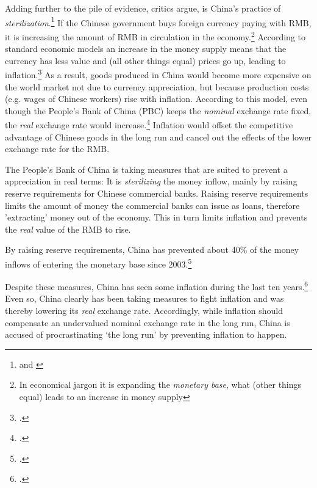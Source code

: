 Adding further to the pile of evidence, critics argue, is China's 
practice of \emph{sterilization}.\footnote{\cite{Humpage2010} and \cite[p. ?]{Wang2011}} If the Chinese government buys foreign 
currency paying with RMB, it is increasing the amount of RMB in 
circulation in the economy.\footnote{In economical jargon it is 
expanding the \emph{monetary base}, what (other things equal) leads to 
an increase in money supply} According to standard economic models an 
increase in the money supply means that the currency has less value and 
(all other things equal) prices go up, leading to 
inflation.\footnote{\cite[pp. 432]{Krugman2008}.}
As a result, goods produced in China would become more expensive on the 
world market not due to currency appreciation, but because production 
costs (e.g. wages of Chinese workers) rise with inflation. According to 
this model, even though the People's Bank of China (PBC) keeps the 
\emph{nominal} exchange rate fixed, the \emph{real} exchange rate would 
increase.\footnote{\cite[p. 509]{Krugman2008}.} Inflation would offset the 
competitive advantage of Chinese goods in the long run and cancel out 
the effects of the lower exchange rate for the RMB.

The People's Bank of China is taking measures that are suited to prevent 
a appreciation in real terms: It is \emph{sterilizing} the money inflow, 
mainly by raising reserve requirements for Chinese commercial banks.  
Raising reserve requirements limits the amount of money the commercial 
banks can issue as loans, therefore 'extracting' money out of the 
economy. This in turn limits inflation and prevents the \emph{real} 
value of the RMB to rise. 

By raising reserve requirements, China has prevented about 40\% of the money 
inflows of entering the monetary base since 2003.\footnote{\cite{Humpage2010}.}%

Despite these measures, China has seen some inflation during the last 
ten years.\footnote{\cite{Humpage2010}.} Even so, China clearly has been 
taking measures to fight inflation and was thereby lowering its 
\emph{real} exchange rate. Accordingly, while inflation should 
compensate an undervalued nominal exchange rate in the long run, China 
is accused of procrastinating `the long run' by preventing inflation to 
happen.



